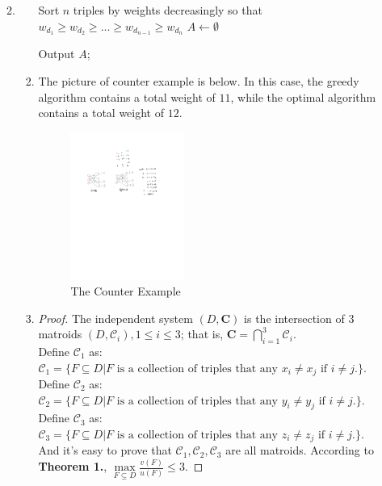 \documentclass[12pt,a4paper]{article}
\makeatletter
\newtheorem*{solution}{Solution}
\theoremstyle{definition}
\renewenvironment{solution}[1][Solution] {\par\pushQED{\qed}\normalfont\topsep6\p@\@plus6\p@\relax\trivlist\item[\hskip\labelsep\bfseries#1\@addpunct{.}]\ignorespaces}{\popQED\endtrivlist\@endpefalse} \makeatother
\makeatother
\begin{document}
\begin{enumerate}
\begin{enumerate}
\begin{solution}
\begin{enumerate}
\begin{algorithm}[H]
						Sort $n$ triples by weights decreasingly so that $w_{d_1}\geqslant w_{d_2}\geqslant ...\geqslant w_{d_{n-1}}\geqslant w_{d_n}$\;
						$A\leftarrow \emptyset$\;
						
						Output $A$;
		
					\end{algorithm}
					\item The picture of counter example is below. In this case, the greedy algorithm contains a total weight of $11$, while the optimal algorithm contains a total weight of $12$.
					\begin{figure}[htbp]
						\centering
						\includegraphics[width=0.4\textwidth]{Slide07-Matroid.pdf}
						\caption{The Counter Example}\label{counter-example}
					\end{figure}
					\item \begin{proof}The independent system $(D,\mathbf{C})$ is the intersection of $3$ matroids $(D,\mathcal{C}_{i}),1\leqslant i\leqslant 3$; that is, $\mathbf{C}=\bigcap_{i=1}^{3} \mathcal{C}_{i}$. 
					\\Define $\mathcal{C}_{1}$ as: $\mathcal{C}_{1}=\{F\subseteq D|F \text{ is a collection of triples that any } x_i\neq x_j \text{ if } i\neq j.\}$.
					\\Define $\mathcal{C}_{2}$ as: $\mathcal{C}_{2}=\{F\subseteq D|F \text{ is a collection of triples that any } y_i\neq y_j \text{ if } i\neq j.\}$.
					\\Define $\mathcal{C}_{3}$ as: $\mathcal{C}_{3}=\{F\subseteq D|F \text{ is a collection of triples that any } z_i\neq z_j \text{ if } i\neq j.\}$.
					\\And it's easy to prove that $\mathcal{C}_{1},\mathcal{C}_{2},\mathcal{C}_{3}$ are all matroids. According to \textbf{Theorem 1.}, $\max\limits_{F \subseteq D} \frac{v(F)}{u(F)} \leq 3$.

\end{proof}
\end{enumerate}
\end{solution}
\end{enumerate}
\end{enumerate}
\end{document}
